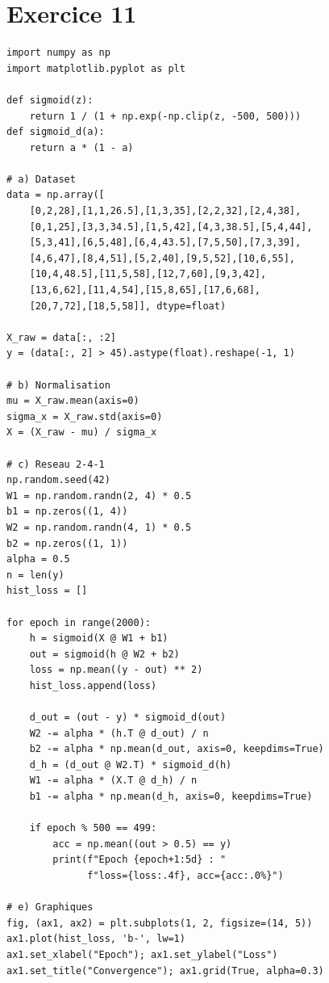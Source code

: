 \section*{Exercice 11 \hfill \exoavance}

\separateur

\begin{pythonbox}
\begin{lstlisting}
import numpy as np
import matplotlib.pyplot as plt

def sigmoid(z):
    return 1 / (1 + np.exp(-np.clip(z, -500, 500)))
def sigmoid_d(a):
    return a * (1 - a)

# a) Dataset
data = np.array([
    [0,2,28],[1,1,26.5],[1,3,35],[2,2,32],[2,4,38],
    [0,1,25],[3,3,34.5],[1,5,42],[4,3,38.5],[5,4,44],
    [5,3,41],[6,5,48],[6,4,43.5],[7,5,50],[7,3,39],
    [4,6,47],[8,4,51],[5,2,40],[9,5,52],[10,6,55],
    [10,4,48.5],[11,5,58],[12,7,60],[9,3,42],
    [13,6,62],[11,4,54],[15,8,65],[17,6,68],
    [20,7,72],[18,5,58]], dtype=float)

X_raw = data[:, :2]
y = (data[:, 2] > 45).astype(float).reshape(-1, 1)

# b) Normalisation
mu = X_raw.mean(axis=0)
sigma_x = X_raw.std(axis=0)
X = (X_raw - mu) / sigma_x

# c) Reseau 2-4-1
np.random.seed(42)
W1 = np.random.randn(2, 4) * 0.5
b1 = np.zeros((1, 4))
W2 = np.random.randn(4, 1) * 0.5
b2 = np.zeros((1, 1))
alpha = 0.5
n = len(y)
hist_loss = []

for epoch in range(2000):
    h = sigmoid(X @ W1 + b1)
    out = sigmoid(h @ W2 + b2)
    loss = np.mean((y - out) ** 2)
    hist_loss.append(loss)

    d_out = (out - y) * sigmoid_d(out)
    W2 -= alpha * (h.T @ d_out) / n
    b2 -= alpha * np.mean(d_out, axis=0, keepdims=True)
    d_h = (d_out @ W2.T) * sigmoid_d(h)
    W1 -= alpha * (X.T @ d_h) / n
    b1 -= alpha * np.mean(d_h, axis=0, keepdims=True)

    if epoch % 500 == 499:
        acc = np.mean((out > 0.5) == y)
        print(f"Epoch {epoch+1:5d} : "
              f"loss={loss:.4f}, acc={acc:.0%}")

# e) Graphiques
fig, (ax1, ax2) = plt.subplots(1, 2, figsize=(14, 5))
ax1.plot(hist_loss, 'b-', lw=1)
ax1.set_xlabel("Epoch"); ax1.set_ylabel("Loss")
ax1.set_title("Convergence"); ax1.grid(True, alpha=0.3)


\end{lstlisting}
\end{pythonbox}
